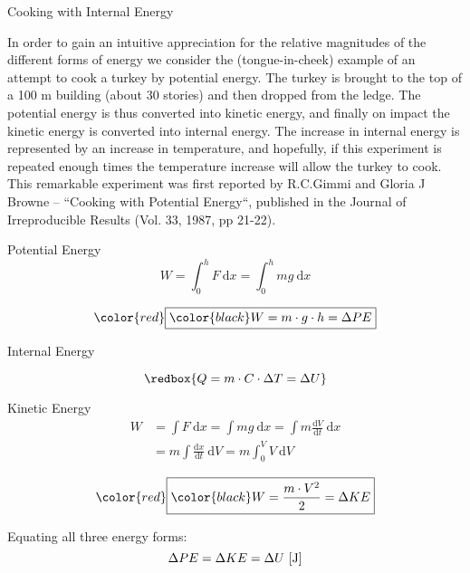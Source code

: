 \begin{example}{Cooking with Internal Energy}

In order to gain an intuitive appreciation for the relative magnitudes of the different forms of energy we consider the (tongue-in-cheek) example of an attempt to cook a turkey by potential energy. The turkey is brought to the top of a 100 m building (about 30 stories) and then dropped from the ledge. The potential energy is thus converted into kinetic energy, and finally on impact the kinetic energy is converted into internal energy. The increase in internal energy is represented by an increase in temperature, and hopefully, if this experiment is repeated enough times the temperature increase will allow the turkey to cook. This remarkable experiment was first reported by R.C.Gimmi and Gloria J Browne – “Cooking with Potential Energy“, published in the Journal of Irreproducible Results (Vol. 33, 1987, pp 21-22).

Potential Energy
\begin{equation*}
W=\int_0^h F \ \mathrm{d}x = \int_0^h m g \ \mathrm{d}x
\end{equation*}

\begin{equation*}
\color{red}\boxed{\color{black}W=m\cdot g \cdot h=\Delta PE}
\end{equation*}

Internal Energy

\begin{equation*}
\redbox{Q=m \cdot C \cdot \Delta T = \Delta U}
\end{equation*}

Kinetic Energy
  \begin{align*} W &= \int F \ \mathrm{d}x = \int mg \ \mathrm{d}x = \int m \frac{\mathrm{d}{V}}{\mathrm{d}t} \ \mathrm{d}x \\ &= m \int \frac{\mathrm{d}x}{\mathrm{d}t} \ \mathrm{d}{V} = m \int_0^{{V}} {V} \ \mathrm{d}{V} \end{align*}

\begin{equation*}
  \color{red}\boxed{\color{black}W=\frac{m \cdot {V}^2}{2}=\Delta KE}
\end{equation*}

Equating all three energy forms:
\begin{equation*}
\Delta PE = \Delta KE = \Delta U \ [\rm J]
\end{equation*}


\end{example}
